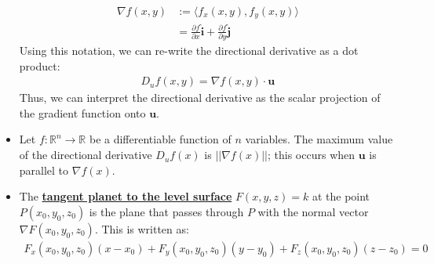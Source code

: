 \documentclass[reqno,11pt]{amsart}
\theoremstyle{definition}
\theoremstyle{remark}
\newcommand{\R}{\mathbb{R}}
\newcommand{\dfn}[1]{\underline{\textbf{#1}}}
\begin{document}
\begin{itemize}[noitemsep]
\begin{align*}
		\nabla f(x,y) & := \langle f_x(x,y), f_y(x,y) \rangle \\
					  & = \frac{\partial f}{\partial x} \mathbf{\hat{i}} + \frac{\partial f}{\partial y} \mathbf{\hat{j}} 
	\end{align*}
	Using this notation, we can re-write the directional derivative as a dot product: 
	\begin{align*}
		D_u f(x,y) = \nabla f(x,y) \cdot \mathbf{u} 
	\end{align*}
	Thus, we can interpret the directional derivative as the scalar projection of the gradient function onto $\mathbf{u}$. 
	\item Let $f: \R^n \rightarrow \R$ be a differentiable function of $n$ variables. The maximum value of the directional derivative $D_uf(x)$ is $|| \nabla f(x) ||$; this occurs when $\mathbf{u}$ is parallel to $\nabla f(x)$. 
	\item The \dfn{tangent planet to the level surface} $F(x,y,z) = k$ at the point $P(x_0, y_0, z_0)$ is the plane that passes through $P$ with the normal vector $\nabla F(x_0, y_0, z_0)$. This is written as:
	\begin{align}
		F_x(x_0, y_0, z_0) (x-x_0) + F_y(x_0, y_0, z_0) (y-y_0) + F_z (x_0, y_0, z_0) (z-z_0) = 0 	
	\end{align}
\end{itemize}
\end{document}
